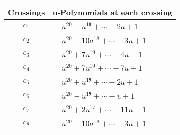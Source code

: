 \documentclass[1p]{elsarticle_modified}
\theoremstyle{definition}
\begin{document}
\begin{tabular}{m{50pt}|m{274pt}}
Crossings & \hspace{64pt}u-Polynomials at each crossing \\
\hline $$\begin{aligned}c_{1}\end{aligned}$$&$\begin{aligned}
&u^{20}- u^{19}+\cdots-2 u+1
\end{aligned}$\\
\hline $$\begin{aligned}c_{2}\end{aligned}$$&$\begin{aligned}
&u^{20}-10 u^{18}+\cdots-3 u+1
\end{aligned}$\\
\hline $$\begin{aligned}c_{3}\end{aligned}$$&$\begin{aligned}
&u^{20}+7 u^{19}+\cdots-4 u-1
\end{aligned}$\\
\hline $$\begin{aligned}c_{4}\end{aligned}$$&$\begin{aligned}
&u^{20}+7 u^{19}+\cdots+7 u+1
\end{aligned}$\\
\hline $$\begin{aligned}c_{5}\end{aligned}$$&$\begin{aligned}
&u^{20}+u^{19}+\cdots+2 u+1
\end{aligned}$\\
\hline $$\begin{aligned}c_{6}\end{aligned}$$&$\begin{aligned}
&u^{20}- u^{19}+\cdots+u+1
\end{aligned}$\\
\hline $$\begin{aligned}c_{7}\end{aligned}$$&$\begin{aligned}
&u^{20}+2 u^{17}+\cdots-11 u-1
\end{aligned}$\\
\hline $$\begin{aligned}c_{8}\end{aligned}$$&$\begin{aligned}
&u^{20}-10 u^{18}+\cdots+3 u+1
\end{aligned}$\\

\end{tabular}
\end{document}
